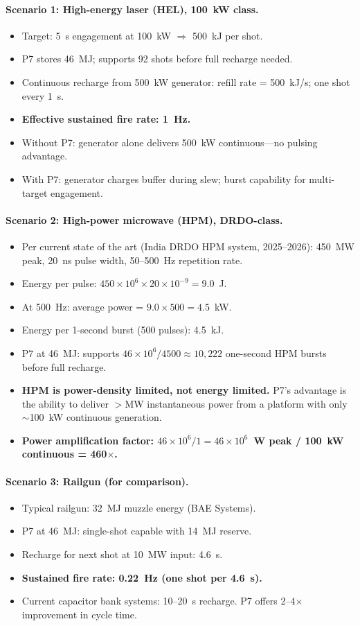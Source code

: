 \documentclass[11pt]{article}
\newcommand{\ee}[1]{\times 10^{#1}}
\begin{document}
\paragraph{Scenario 1: High-energy laser (HEL), 100~kW class.}
\begin{itemize}
\item Target: 5~s engagement at 100~kW $\Rightarrow$ 500~kJ per shot.
\item P7 stores 46~MJ; supports 92 shots before full recharge needed.
\item Continuous recharge from 500~kW generator: refill rate
  = 500~kJ/s; one shot every 1~s.
\item \textbf{Effective sustained fire rate: 1~Hz.}
\item Without P7: generator alone delivers 500~kW continuous---no pulsing advantage.
\item With P7: generator charges buffer during slew; burst capability
  for multi-target engagement.
\end{itemize}

\paragraph{Scenario 2: High-power microwave (HPM), DRDO-class.}
\begin{itemize}
\item Per current state of the art (India DRDO HPM system, 2025--2026):
  450~MW peak, 20~ns pulse width, 50--500~Hz repetition rate.
\item Energy per pulse: $450\ee{6} \times 20\ee{-9} = 9.0$~J.
\item At 500~Hz: average power = $9.0 \times 500 = 4.5$~kW.
\item Energy per 1-second burst (500 pulses): 4.5~kJ.
\item P7 at 46~MJ: supports $46\ee{6}/4500 \approx 10,222$ one-second
  HPM bursts before full recharge.
\item \textbf{HPM is power-density limited, not energy limited.}
  P7's advantage is the ability to deliver $>$MW instantaneous
  power from a platform with only $\sim$100~kW continuous generation.
\item \textbf{Power amplification factor: $46\ee{6}/1 = 46\ee{6}$~W
  peak / 100~kW continuous = 460$\times$.}
\end{itemize}

\paragraph{Scenario 3: Railgun (for comparison).}
\begin{itemize}
\item Typical railgun: 32~MJ muzzle energy (BAE Systems).
\item P7 at 46~MJ: single-shot capable with 14~MJ reserve.
\item Recharge for next shot at 10~MW input: 4.6~s.
\item \textbf{Sustained fire rate: 0.22~Hz (one shot per 4.6~s).}
\item Current capacitor bank systems: 10--20~s recharge.
  P7 offers 2--4$\times$ improvement in cycle time.
\end{itemize}
\end{document}
